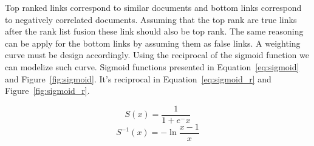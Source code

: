 Top ranked links correspond to similar documents and bottom links correspond to negatively correlated documents.
Assuming that the top rank are true links after the rank list fusion these link should also be top rank.
The same reasoning can be apply for the bottom links by assuming them as false links.
A weighting curve must be design accordingly.
Using the reciprocal of the sigmoid function we can modelize such curve.
Sigmoid functions presented in Equation~\ref{eq:sigmoid} and Figure~\ref{fig:sigmoid}.
It's reciprocal in Equation~\ref{eq:sigmoid_r} and Figure~\ref{fig:sigmoid_r}.

\begin{equation}
  \label{eq:sigmoid}
  S(x) = \frac{1}{1+e^-x}
\end{equation}
\begin{equation}
  \label{eq:sigmoid_r}
  S^{-1}(x) = -\ln{\frac{x-1}{x}}
\end{equation}

